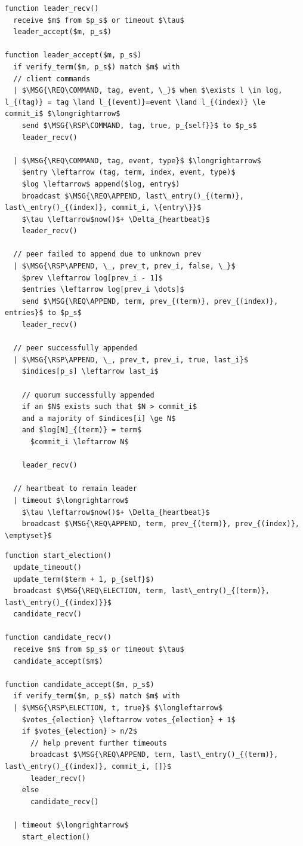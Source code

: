 \documentclass{article}
\begin{document}
	\begin{mdframed}[backgroundcolor=Papyrus]
	\begin{lstlisting}[style=pseudo, caption={Leader logic.}]
function leader_recv()
  receive $m$ from $p_s$ or timeout $\tau$
  leader_accept($m, p_s$)

function leader_accept($m, p_s$)
  if verify_term($m, p_s$) match $m$ with
  // client commands
  | $\MSG{\REQ\COMMAND, tag, event, \_}$ when $\exists l \in log, l_{(tag)} = tag \land l_{(event)}=event \land l_{(index)} \le commit_i$ $\longrightarrow$
    send $\MSG{\RSP\COMMAND, tag, true, p_{self}}$ to $p_s$
    leader_recv()

  | $\MSG{\REQ\COMMAND, tag, event, type}$ $\longrightarrow$
    $entry \leftarrow (tag, term, index, event, type)$
    $log \leftarrow$ append($log, entry$)
    broadcast $\MSG{\REQ\APPEND, last\_entry()_{(term)}, last\_entry()_{(index)}, commit_i, \{entry\}}$
    $\tau \leftarrow$now()$+ \Delta_{heartbeat}$
    leader_recv()

  // peer failed to append due to unknown prev
  | $\MSG{\RSP\APPEND, \_, prev_t, prev_i, false, \_}$
    $prev \leftarrow log[prev_i - 1]$
    $entries \leftarrow log[prev_i \dots]$
    send $\MSG{\REQ\APPEND, term, prev_{(term)}, prev_{(index)}, entries}$ to $p_s$
    leader_recv()

  // peer successfully appended
  | $\MSG{\RSP\APPEND, \_, prev_t, prev_i, true, last_i}$
    $indices[p_s] \leftarrow last_i$

    // quorum successfully appended
    if an $N$ exists such that $N > commit_i$
    and a majority of $indices[i] \ge N$
    and $log[N]_{(term)} = term$
      $commit_i \leftarrow N$

    leader_recv()

  // heartbeat to remain leader
  | timeout $\longrightarrow$
    $\tau \leftarrow$now()$+ \Delta_{heartbeat}$
    broadcast $\MSG{\REQ\APPEND, term, prev_{(term)}, prev_{(index)}, \emptyset}$
	\end{lstlisting}
	\end{mdframed}

	\begin{mdframed}[backgroundcolor=Papyrus]
	\begin{lstlisting}[style=pseudo, caption={Candidate logic.}]
function start_election()
  update_timeout()
  update_term($term + 1, p_{self}$)
  broadcast $\MSG{\REQ\ELECTION, term, last\_entry()_{(term)}, last\_entry()_{(index)}}$
  candidate_recv()

function candidate_recv()
  receive $m$ from $p_s$ or timeout $\tau$
  candidate_accept($m$)

function candidate_accept($m, p_s$)
  if verify_term($m, p_s$) match $m$ with
  | $\MSG{\RSP\ELECTION, t, true}$ $\longleftarrow$
    $votes_{election} \leftarrow votes_{election} + 1$
    if $votes_{election} > n/2$
      // help prevent further timeouts
      broadcast $\MSG{\REQ\APPEND, term, last\_entry()_{(term)}, last\_entry()_{(index)}, commit_i, []}$
      leader_recv()
    else
      candidate_recv()

  | timeout $\longrightarrow$
    start_election()
	\end{lstlisting}
	\end{mdframed}
\end{document}
